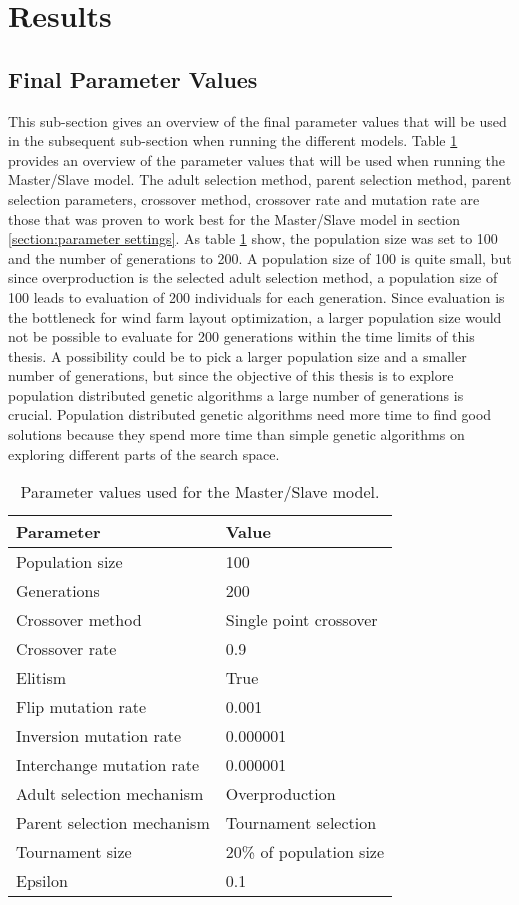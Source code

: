 \section{Results}\label{section:results}


\subsection{Final Parameter Values}
This sub-section gives an overview of the final parameter values that will be used in the subsequent sub-section when running the different models. Table \ref{table:final parameter settings master slave model} provides an overview of the parameter values that will be used when running the Master/Slave model. The adult selection method, parent selection method, parent selection parameters, crossover method, crossover rate and mutation rate are those that was proven to work best for the Master/Slave model in section \ref{section:parameter settings}. As table \ref{table:final parameter settings master slave model} show, the population size was set to 100 and the number of generations to 200. A population size of 100 is quite small, but since overproduction is the selected adult selection method, a population size of 100 leads to evaluation of 200 individuals for each generation. Since evaluation is the bottleneck for wind farm layout optimization, a larger population size would not be possible to evaluate for 200 generations within the time limits of this thesis. A possibility could be to pick a larger population size and a smaller number of generations, but since the objective of this thesis is to explore population distributed genetic algorithms a large number of generations is crucial. Population distributed genetic algorithms need more time to find good solutions because they spend more time than simple genetic algorithms on exploring different parts of the search space.\\

\begin{table}[h!]
\centering
\caption{Parameter values used for the Master/Slave model.}
\label{table:final parameter settings master slave model}
\begin{tabular}{l|l}
\textbf{Parameter} & \textbf{Value} \\ 
\hline 
Population size & 100 \\  
Generations & 200 \\ 
Crossover method & Single point crossover \\ 
Crossover rate & 0.9 \\ 
Elitism & True \\ 
Flip mutation rate & 0.001 \\ 
Inversion mutation rate & 0.000001 \\ 
Interchange mutation rate & 0.000001 \\ 
Adult selection mechanism & Overproduction \\ 
Parent selection mechanism & Tournament selection \\ 
Tournament size & 20\% of population size\\ 
Epsilon & 0.1 \\ 
\end{tabular} 
\end{table}

